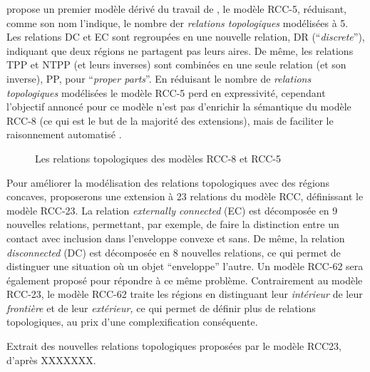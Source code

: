 \textcite{Bennett1994} propose un premier modèle dérivé du travail de
\textcite{Randell1992}, le modèle RCC-5, réduisant, comme son nom
l'indique, le nombre der \emph{relations topologiques} modélisées à
5. Les relations DC et EC sont regroupées en une nouvelle relation, DR
(\enquote{\emph{discrete}}), indiquant que deux régions ne partagent
pas leurs aires. De même, les relations TPP et NTPP (et leurs
inverses) sont combinées en une seule relation (et son inverse), PP,
pour \enquote{\emph{proper parts}}. En réduisant le nombre de
\emph{relations topologiques} modélisées le modèle RCC-5 perd en
expressivité, cependant l'objectif annoncé pour ce modèle n'est pas
d’enrichir la sémantique du modèle RCC-8 (ce qui est le but de la
majorité des extensions), mais de faciliter le raisonnement automatisé
\textcite{Bennett1994}.

\begin{figure}
  \centering
  
  \caption{Les relations topologiques des modèles RCC-8 et RCC-5}
  \label{fig:RCC}
\end{figure}

Pour améliorer la modélisation des relations topologiques avec des
régions concaves, \textcite{Cohn1997} proposerons une extension à 23
relations du modèle RCC, définissant le modèle RCC-23. La relation
\emph{externally connected} (EC) est décomposée en 9 nouvelles
relations, permettant, par exemple, de faire la distinction entre un
contact avec inclusion dans l'enveloppe convexe et sans. De même, la
relation \emph{disconnected} (DC) est décomposée en 8 nouvelles
relations, ce qui permet de distinguer une situation où un objet
\enquote{enveloppe} l'autre. Un modèle RCC-62 sera également proposé
pour répondre à ce même problème. Contrairement au modèle RCC-23, le
modèle RCC-62 traite les régions en distinguant leur \emph{intérieur}
de leur \emph{frontière} et de leur \emph{extérieur,} ce qui permet de
définir plus de relations topologiques, au prix d'une complexification
conséquente.

\begin{table}
  \centering
  
  \caption{Extrait des nouvelles relations topologiques proposées par
le modèle RCC23, d'après XXXXXXX.}
  \label{tab:RCC8_vs_RCC23}
\end{table}

